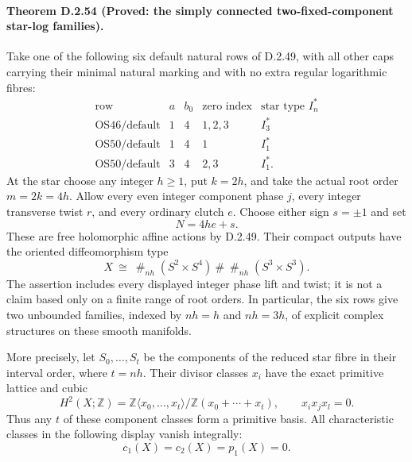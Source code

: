 \paragraph{Theorem D.2.54 (Proved: the simply connected two-fixed-component star-log families).}
Take one of the following six default natural rows of D.2.49, with
all other caps carrying their minimal natural marking and with no extra
regular logarithmic fibres:
\[
\begin{array}{c|c|c|c|c}
\text{row}&a&b_0&\text{zero index}&\text{star type }I_n^*\\\hline
\mathrm{OS46/default}&1&4&1,2,3&I_3^*\\
\mathrm{OS50/default}&1&4&1&I_1^*\\
\mathrm{OS50/default}&3&4&2,3&I_1^*.
\end{array}                                                   \tag{D.SS1}
\]
At the star choose any integer $h\ge1$, put $k=2h$, and take the
actual root order $m=2k=4h$. Allow every even integer component phase
$j$, every integer transverse twist $r$, and every ordinary clutch
$e$. Choose either sign $s=\pm1$ and set
\[
                         N=4he+s.                            \tag{D.SS2}
\]
These are free holomorphic affine actions by D.2.49. Their compact
outputs have the oriented diffeomorphism type
\[
 X\ \cong\ \mathop{\#}_{nh}(S^2\times S^4)
                    \ \#\ \mathop{\#}_{nh}(S^3\times S^3).
                                                               \tag{D.SS3}
\]
The assertion includes every displayed integer phase lift and twist;
it is not a claim based only on a finite range of root orders.
In particular, the six rows give two unbounded families, indexed by
$nh=h$ and $nh=3h$, of explicit complex structures on these smooth
manifolds.

More precisely, let $S_0,\ldots,S_t$ be the components of the reduced
star fibre in their interval order, where $t=nh$. Their divisor
classes $x_i$ have the exact primitive lattice and cubic
\[
 H^2(X;\mathbb Z)=
    \mathbb Z\langle x_0,\ldots,x_t\rangle/
                         \mathbb Z(x_0+\cdots+x_t),
 \qquad x_i x_j x_l=0.                                     \tag{D.SS4}
\]
Thus any $t$ of these component classes form a primitive basis.
All characteristic classes in the following display vanish integrally:
\[
             c_1(X)=c_2(X)=p_1(X)=0.                       \tag{D.SS5}
\]

